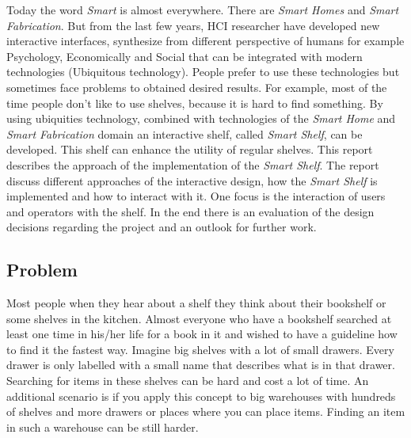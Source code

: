 Today the word \textit{Smart} is almost everywhere. There are \textit{Smart Homes} and \textit{Smart Fabrication}. 
But from the last few years, HCI researcher have developed new
interactive interfaces, synthesize from different perspective of humans for example Psychology, Economically and Social that can be integrated with modern
technologies (Ubiquitous technology). 
People prefer to use these technologies but sometimes face problems to obtained desired results. 
For example, most of the time people don't like to use shelves, because it is hard to find something. 
By using ubiquities technology, combined with technologies of the \textit{Smart Home} and \textit{Smart Fabrication} domain an interactive shelf, called \textit{Smart Shelf}, can be developed. 
This shelf can enhance the utility of regular shelves. 
This report describes the approach of the implementation of the \textit{Smart Shelf}. 
The report discuss different approaches of the interactive design, how the \textit{Smart Shelf} is implemented and how to interact with it. 
One focus is the interaction of users and operators with the shelf. 
In the end there is an evaluation of the design decisions regarding the project and an outlook for further work. 

\subsection{Problem}
Most people when they hear about a shelf they think about their bookshelf or some shelves in the kitchen. 
Almost everyone who have a bookshelf searched at least one time in his/her life for a book in it and wished to have a guideline how to find it the fastest way. 
Imagine big shelves with a lot of small drawers. 
Every drawer is only labelled with a small name that describes what is in that drawer. 
Searching for items in these shelves can be hard and cost a lot of time. 
An additional scenario is if you apply this concept to big warehouses with hundreds of shelves and more drawers or places where you can place items. 
Finding an item in such a warehouse can be still harder. 

